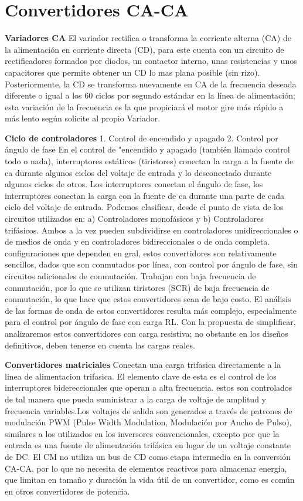 \documentclass[10pt,letterpaper]{article}
\begin{document}
\section{Convertidores CA-CA}
\textbf{Variadores CA}
El variador rectifica o transforma la corriente alterna (CA) de la alimentación en corriente directa (CD), para este cuenta con un circuito de rectificadores formados por diodos, un contactor interno, unas resistencias y unos capacitores  que permite obtener un CD lo mas plana posible (sin rizo).  Posteriormente, la CD se transforma nuevamente en CA de la frecuencia deseada diferente o igual a los 60 ciclos por segundo estándar en la línea de alimentación;  esta variación de la frecuencia es la que propiciará el motor gire más rápido a más lento según solicite al propio Variador.

\textbf{Ciclo de controladores}
1. Control de encendido y apagado 
2. Control por ángulo de fase
 En el control de "encendido y apagado (también llamado control todo o nada), interruptores estáticos (tiristores) conectan la carga a la fuente de  ca durante algunos ciclos del voltaje de entrada y lo desconectado durante algunos ciclos de otros. Los interruptores conectan el ángulo de fase, los interruptores conectan la carga con la fuente de ca durante una parte de cada ciclo del voltaje de entrada.  Podemos clasificar, desde el punto de vista de los circuitos utilizados en: a) Controladores monofásicos y b) Controladores trifásicos. Ambos a la vez pueden subdividirse en controladores unidireccionales o de medios de onda y en controladores bidireccionales o de onda completa.  configuraciones que dependen en gral, estos convertidores son relativamente sencillos, dados que son conmutados por línea, con control por ángulo de fase,  sin circuitos adicionales de conmutación.  Trabajan con baja frecuencia de conmutación, por lo que se utilizan tiristores (SCR) de baja frecuencia de conmutación, lo que hace que estos convertidores sean de bajo costo.  El análisis de las formas de onda de estos convertidores resulta más complejo, especialmente para el control por ángulo de fase con carga RL.  Con la propuesta de simplificar, analizaremos estos convertidores con carga resistiva;  no obstante en los diseños definitivos, deben tenerse en cuenta las cargas reales.

\textbf{Convertidores matriciales}
Conectan una carga trifasica directamente a la linea de alimentacion trifasica. El elemento clave de esta es el control de los interruptores bidereccionales que operan a alta frecuencia. estos son controlados de tal manera que pueda suministrar a la carga de voltaje de amplitud y frecuencia variables.Los voltajes de salida son generados a través de patrones de modulación PWM (Pulse Width Modulation, Modulación por Ancho de Pulso), similares a los utilizados en los inversores convencionales, excepto por que la entrada es una fuente de alimentación trifásica en lugar de un voltaje constante de DC. El CM no utiliza un bus de CD como etapa intermedia en la conversión CA-CA, por lo que no necesita de elementos reactivos para almacenar energía, que limitan en tamaño y duración la vida útil de un convertidor, como es común en otros convertidores de potencia.
\end{document}
